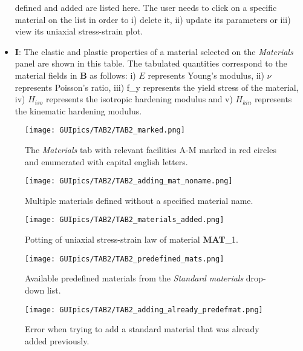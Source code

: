 \begin{appendices}
\begin{itemize}
	defined and added are listed here. The user needs to click on a specific 
	material on the list in order to i) delete it, ii) update its parameters or 
	iii) view its uniaxial stress-strain plot.
	\item \textbf{I}: The elastic and plastic properties of a material selected 
	on the \textit{Materials} panel are shown in this table. The tabulated 
	quantities correspond to the material fields in \textbf{B} as follows:
	i) $E$ represents Young's modulus, ii) $\nu$ represents Poisson's 
	ratio, iii) f\_y represents the yield stress of the material, iv) 
	$H_{iso}$ represents the isotropic hardening modulus and v) $H_{kin}$ 
	represents the kinematic hardening modulus.
\end{itemize}

\begin{figure}
	\centering
	\texttt{[image: GUIpics/TAB2/TAB2\_marked.png]}
	\caption{The \textit{Materials} tab with relevant facilities A-M marked in 
		red circles 
		and enumerated with capital english letters.}
	\label{fig:TAB2_marked}
\end{figure}


\begin{figure}
	\centering
	\texttt{[image: GUIpics/TAB2/TAB2\_adding\_mat\_noname.png]}
	\caption{Multiple materials defined without a specified material name.}
	\label{fig:TAB2_adding_mat_noname}
\end{figure}

\begin{figure}
	\centering
	\texttt{[image: GUIpics/TAB2/TAB2\_materials\_added.png]}
	\caption{Potting of uniaxial stress-strain law of material \textbf{MAT}\_1.}
	\label{fig:TAB2_materials_added}
\end{figure}

\begin{figure}
	\centering
	\texttt{[image: GUIpics/TAB2/TAB2\_predefined\_mats.png]}
	\caption{Available predefined materials from the \textit{Standard 
			materials} drop-down list.}
	\label{fig:TAB2_predefined_mats}
\end{figure}

\begin{figure}
	\centering
	\texttt{[image: GUIpics/TAB2/TAB2\_adding\_already\_predefmat.png]}
	\caption{Error when trying to add a standard material that was already 
		added previously.}
	\label{fig:TAB2_adding_already_predefmat}
\end{figure}


\end{appendices}
